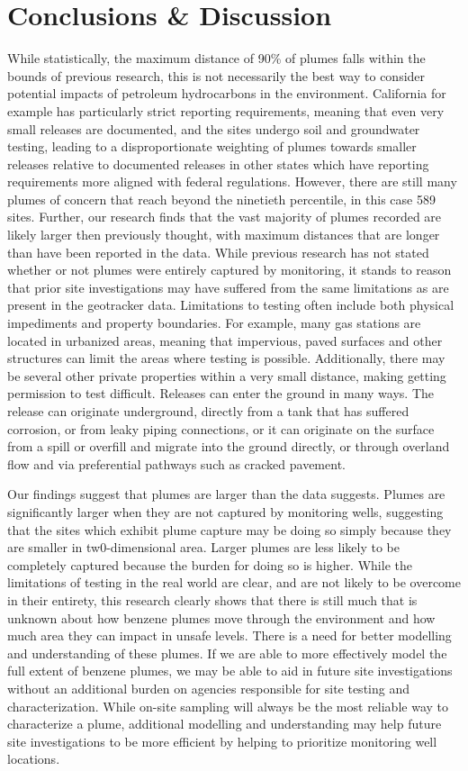 \documentclass[draft,linenumbers]{agujournal2018}
\begin{document}
\section{Conclusions \& Discussion}

While statistically, the maximum distance of 90\% of plumes falls within
the bounds of previous research, this is not necessarily the best way to
consider potential impacts of petroleum hydrocarbons in the environment.
California for example has particularly strict reporting requirements,
meaning that even very small releases are documented, and the sites
undergo soil and groundwater testing, leading to a disproportionate
weighting of plumes towards smaller releases relative to documented
releases in other states which have reporting requirements more aligned
with federal regulations. However, there are still many plumes of
concern that reach beyond the ninetieth percentile, in this case 589
sites. Further, our research finds that the vast majority of plumes
recorded are likely larger then previously thought, with maximum
distances that are longer than have been reported in the data. While
previous research has not stated whether or not plumes were entirely
captured by monitoring, it stands to reason that prior site
investigations may have suffered from the same limitations as are
present in the geotracker data. Limitations to testing often include
both physical impediments and property boundaries. For example, many gas
stations are located in urbanized areas, meaning that impervious, paved
surfaces and other structures can limit the areas where testing is
possible. Additionally, there may be several other private properties
within a very small distance, making getting permission to test
difficult. Releases can enter the ground in many ways. The release can
originate underground, directly from a tank that has suffered corrosion,
or from leaky piping connections, or it can originate on the surface
from a spill or overfill and migrate into the ground directly, or
through overland flow and via preferential pathways such as cracked
pavement.

Our findings suggest that plumes are larger than the data suggests.
Plumes are significantly larger when they are not captured by monitoring
wells, suggesting that the sites which exhibit plume capture may be
doing so simply because they are smaller in tw0-dimensional area. Larger
plumes are less likely to be completely captured because the burden for
doing so is higher. While the limitations of testing in the real world
are clear, and are not likely to be overcome in their entirety, this
research clearly shows that there is still much that is unknown about
how benzene plumes move through the environment and how much area they
can impact in unsafe levels. There is a need for better modelling and
understanding of these plumes. If we are able to more effectively model
the full extent of benzene plumes, we may be able to aid in future site
investigations without an additional burden on agencies responsible for
site testing and characterization. While on-site sampling will always be
the most reliable way to characterize a plume, additional modelling and
understanding may help future site investigations to be more efficient
by helping to prioritize monitoring well locations.
\end{document}
